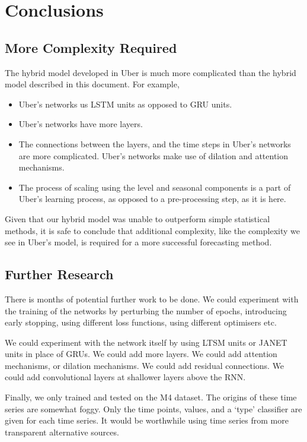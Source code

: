 \documentclass[a4paper,12pt]{article}
\theoremstyle{definition}
\begin{document}
\section{Conclusions}
\subsection{More Complexity Required}
The hybrid model developed in Uber is much more complicated than the hybrid model described in this document. For example, 
\begin{itemize}
  \item Uber's networks us LSTM units as opposed to GRU units.
  \item Uber's networks have more layers.
  \item The connections between the layers, and the time steps in Uber's networks are more complicated. Uber's networks make use of dilation and attention mechanisms.
  \item The process of scaling using the level and seasonal components is a part of Uber's learning process, as opposed to a pre-processing step, as it is here.
\end{itemize}
Given that our hybrid model was unable to outperform simple statistical methods, it is safe to conclude that additional complexity, like the complexity we see in Uber's model, is required for a more successful forecasting method.

\subsection{Further Research}
There is months of potential further work to be done. We could experiment with the training of the networks by perturbing the number of epochs, introducing early stopping, using different loss functions, using different optimisers etc. 

We could experiment with the network itself by using LTSM units or JANET units in place of GRUs. We could add more layers. We could add attention mechanisms, or dilation mechanisms. We could add residual connections. We could add convolutional layers at shallower layers above the RNN. 

Finally, we only trained and tested on the M4 dataset. The origins of these time series are somewhat foggy. Only the time points, values, and a `type' classifier are given for each time series. It would be worthwhile using time series from more transparent alternative sources.

\newpage


\end{document}
